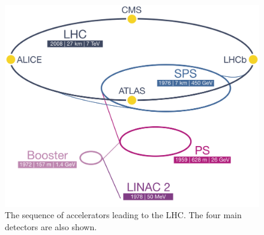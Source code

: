 
\begin{figure}
	\includegraphics[width=\largefigwidth]{tex/experiment/lhc}
	\caption{The sequence of accelerators leading to the LHC. The four main detectors are also shown.}
	\label{fig:lhc}
\end{figure}
